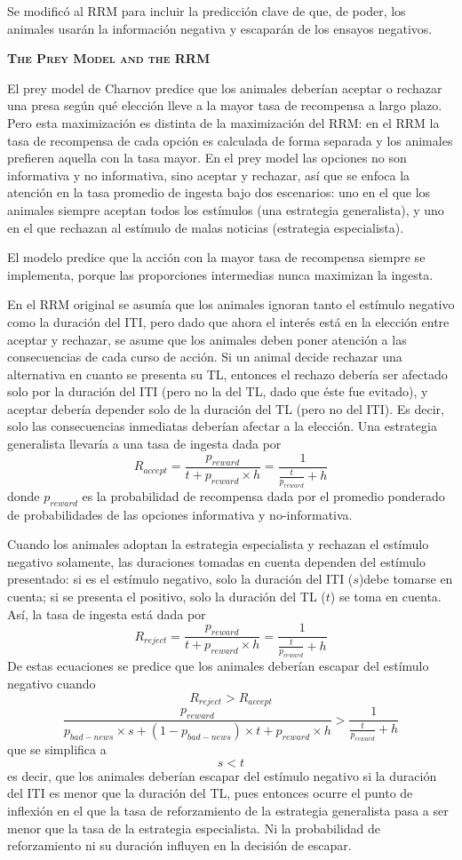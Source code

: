\documentclass[a4paper,12pt]{article}
\begin{document}
Se modificó al RRM para incluir la predicción clave de que, de poder, los animales usarán la información negativa y escaparán de los ensayos negativos.

{\scshape\bfseries The Prey Model and the RRM}

El prey model de Charnov predice que los animales deberían aceptar o rechazar una presa según qué elección lleve a la mayor tasa de recompensa a largo plazo. Pero esta maximización es distinta de la maximización del RRM: en el RRM la tasa de recompensa de cada opción es calculada de forma separada y los animales prefieren aquella con la tasa mayor. En el prey model las opciones no son informativa y no informativa, sino aceptar y rechazar, así que se enfoca la atención en la tasa promedio de ingesta bajo dos escenarios: uno en el que los animales siempre aceptan todos los estímulos (una estrategia generalista), y uno en el que rechazan al estímulo de malas noticias (estrategia especialista).

El modelo predice que la acción con la mayor tasa de recompensa siempre se implementa, porque las proporciones intermedias nunca maximizan la ingesta.

En el RRM original se asumía que los animales ignoran tanto el estímulo negativo como la duración del ITI, pero dado que ahora el interés está en la elección entre aceptar y rechazar, se asume que los animales deben poner atención a las consecuencias de cada curso de acción. Si un animal decide rechazar una alternativa en cuanto se presenta su TL, entonces el rechazo debería ser afectado solo por la duración del ITI (pero no la del TL, dado que éste fue evitado), y aceptar debería depender solo de la duración del TL (pero no del ITI). Es decir, solo las consecuencias inmediatas deberían afectar a la elección. Una estrategia generalista llevaría a una tasa de ingesta dada por
$$
R_{accept}=\frac{p_{reward}}{t+p_{reward}\times h}=\frac {1}{\frac{t}{p_{reward}} + h}
$$
donde $p_{reward}$ es la probabilidad de recompensa dada por el promedio ponderado de probabilidades de las opciones informativa y no-informativa.

Cuando los animales adoptan la estrategia especialista y rechazan el estímulo negativo solamente, las duraciones tomadas en cuenta dependen del estímulo presentado: si es el estímulo negativo, solo la duración del ITI ($s$)debe tomarse en cuenta; si se presenta el positivo, solo la duración del TL ($t$) se toma en cuenta. Así, la tasa de ingesta está dada por
$$
R_{reject}=\frac{p_{reward}}{t + p_{reward} \times h}=\frac{1}{\frac{t}{p_{reward}}+h}
$$
De estas ecuaciones se predice que los animales deberían escapar del estímulo negativo cuando 
$$
R_{reject} > R_{accept}
$$
$$
\frac{p_{reward}}{p_{bad-news}\times s + (1-p_{bad-news}) \times t + p_{reward}\times h}>\frac{1}{\frac{t}{p_{reward}}+h}
$$
que se simplifica a
$$ s <t $$
es decir, que los animales deberían escapar del estímulo negativo si la duración del ITI es menor que la duración del TL, pues entonces ocurre el punto de inflexión en el que la tasa de reforzamiento de la estrategia generalista pasa a ser menor que la tasa de la estrategia especialista. Ni la probabilidad de reforzamiento ni su duración influyen en la decisión de escapar.
\end{document}
